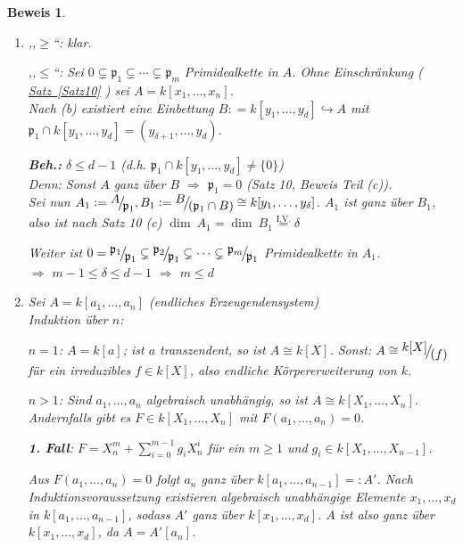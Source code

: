 \documentclass[a4paper,12pt]{scrbook}
\theoremstyle{break}
\theoremstyle{nonumberbreak}
\newtheorem{Bew}{Beweis}
\theoremstyle{nonumberplain}
\newcommand{\defeqr}[0]{\mathrel{\mathop:}=}
\newcommand{\defeql}[0]{=\mathrel{\mathop:}}
\newcommand{\myref}[2]{%
\hyperref[#2]{#1~\ref*{#2}}%
}
\newcommand{\FakRaum}[2]{
  \raisebox{0.7ex}{\ensuremath{#1}}
  \ensuremath{\mkern-3mu}\big/\ensuremath{\mkern-3mu}
  \raisebox{-0.6ex}{\ensuremath{#2}}}
\begin{document}
\begin{Bew}
\begin{enumerate}
\item[(c)] ,,$\geq$``: klar.

,,$\leq$``: Sei $0\subsetneq \mathfrak{p}_1\subsetneq \cdots\subsetneq \mathfrak{p}_m$ Primidealkette
in $A$. Ohne Einschränkung (\myref{Satz}{Satz10}) sei $A=k[x_1,\ldots, x_n]$.\\
Nach (b) existiert eine Einbettung $B\defeqr k[y_1,\ldots,y_d]\hookrightarrow A$ mit
$\mathfrak{p}_1\cap k[y_1,\ldots, y_d] = (y_{\delta+1},\ldots, y_d)$.

\textbf{Beh.:} $\delta\leq d-1$ (d.h. $\mathfrak{p}_1\cap k[y_1,\ldots,y_d]\neq \{0\}$)\\
Denn: Sonst $A$ ganz über $B$ $\Rightarrow$ $\mathfrak{p}_1=0$ (Satz 10, Beweis Teil (c)).\\
Sei nun $A_1\defeqr \FakRaum{A}{\mathfrak{p}_1}, B_1 \defeqr \FakRaum{B}{(\mathfrak{p}_1\cap B)}
\cong k[y_1,\ldots, y_\delta]$. $A_1$ ist ganz über $B_1$, also ist nach Satz 10 (c)
$\dim\ A_1=\dim\ B_1\overset{\text{I.V.}}{=}\delta$

Weiter ist $0 = \FakRaum{\mathfrak{p}_1}{\mathfrak{p}_1} \subsetneq \FakRaum{\mathfrak{p}_2}{\mathfrak{p}_1}
\subsetneq \cdots \subsetneq \FakRaum{\mathfrak{p}_m}{\mathfrak{p}_1}$ Primidealkette in $A_1$.\\
$\Rightarrow$ $m-1\leq \delta \leq d-1$ $\Rightarrow$ $m\leq d$

\item[(a)] Sei $A=k[a_1,\ldots, a_n]$ (endliches Erzeugendensystem)\\
Induktion über $n$: 

$n=1$: $A=k[a]$; ist $a$ transzendent, so ist $A\cong k[X]$. Sonst: $A\cong \FakRaum{k[X]}{(f)}$
für ein irreduzibles $f\in k[X]$, also endliche Körpererweiterung von $k$.

$n> 1$: Sind $a_1,\ldots, a_n$ algebraisch unabhängig, so ist $A\cong k[X_1,\ldots, X_n]$.
Andernfalls gibt es $F\in k[X_1, \ldots, X_n]$ mit $F(a_1, \ldots, a_n)=0$.

\textbf{1. Fall}: $F=X_n^m+\sum_{i=0}^{m-1} g_i X_n^i$ für ein $m\geq 1$ und $g_i\in k[X_1,\ldots, X_{n-1}]$.

Aus $F(a_1, \ldots, a_n)=0$ folgt $a_n$ ganz über $k[a_1, \ldots, a_{n-1}]\defeql A'$.
Nach Induktionsvoraussetzung existieren algebraisch unabhängige Elemente $x_1,\ldots, x_d$ in
$k[a_1,\ldots, a_{n-1}]$, sodass $A'$ ganz über $k[x_1,\ldots,x_d]$. $A$ ist also ganz
über $k[x_1, \ldots, x_d]$, da $A=A'[a_n]$.


\end{enumerate}
\end{Bew}
\end{document}

